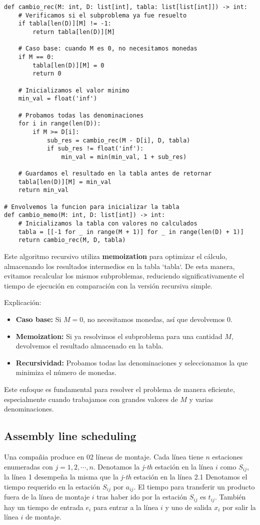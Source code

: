 \documentclass[tikz,11pt,fleqn]{book} %
\begin{document}
\begin{lstlisting}
def cambio_rec(M: int, D: list[int], tabla: list[list[int]]) -> int:
    # Verificamos si el subproblema ya fue resuelto
    if tabla[len(D)][M] != -1:
        return tabla[len(D)][M]

    # Caso base: cuando M es 0, no necesitamos monedas
    if M == 0:
        tabla[len(D)][M] = 0
        return 0

    # Inicializamos el valor minimo
    min_val = float('inf')

    # Probamos todas las denominaciones
    for i in range(len(D)):
        if M >= D[i]:
            sub_res = cambio_rec(M - D[i], D, tabla)
            if sub_res != float('inf'):
                min_val = min(min_val, 1 + sub_res)

    # Guardamos el resultado en la tabla antes de retornar
    tabla[len(D)][M] = min_val
    return min_val

# Envolvemos la funcion para inicializar la tabla
def cambio_memo(M: int, D: list[int]) -> int:
    # Inicializamos la tabla con valores no calculados
    tabla = [[-1 for _ in range(M + 1)] for _ in range(len(D) + 1)]
    return cambio_rec(M, D, tabla)
\end{lstlisting}

Este algoritmo recursivo utiliza \textbf{memoization} para optimizar el cálculo, almacenando los resultados intermedios en la tabla `tabla`. De esta manera, evitamos recalcular los mismos subproblemas, reduciendo significativamente el tiempo de ejecución en comparación con la versión recursiva simple.

Explicación:

\begin{itemize}
    \item\textbf{Caso base:} Si $M=0$, no necesitamos monedas, así que devolvemos 0.
    \item\textbf{Memoization:} Si ya resolvimos el subproblema para una cantidad $M$, devolvemos el resultado almacenado en la tabla.
    \item\textbf{Recursividad:} Probamos todas las denominaciones y seleccionamos la que minimiza el número de monedas.
\end{itemize}

Este enfoque es fundamental para resolver el problema de manera eficiente, especialmente cuando trabajamos con grandes valores de $M$ y varias denominaciones.


\subsection{Assembly line scheduling    }
Una compañia produce en 02 líneas de montaje. Cada línea tiene $n$ estaciones enumeradas con $j=1,2,\cdots,n$. Denotamos la \textit{j-th} estación en la línea $i$ como $S_{ij}$, la línea 1 desempeña la misma que la \textit{j-th} estación en la línea 2.1
Denotamos el tiempo requerido en la estación $S_{ij}$ por $a_{ij}$. El tiempo para transferir un producto fuera de la línea de montaje $i$ tras haber ido por la estación $S_{ij}$ es $t_{ij}$.
También hay un tiempo de entrada $e_i$ para entrar a la línea $i$ y uno de salida $x_i$ por salir la línea $i$ de montaje.
\end{document}
